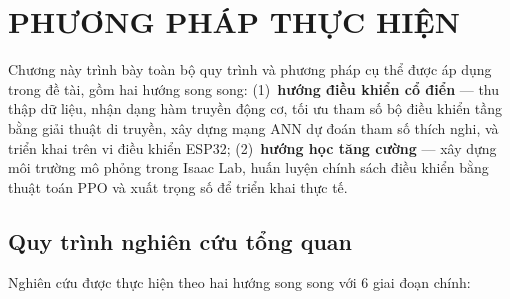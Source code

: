 
\chapter{PHƯƠNG PHÁP THỰC HIỆN}
\label{chap:phuongphap}

Chương này trình bày toàn bộ quy trình và phương pháp cụ thể được áp dụng
trong đề tài, gồm hai hướng song song: (1)~\textbf{hướng điều khiển cổ điển}
— thu thập dữ liệu, nhận dạng hàm truyền động cơ, tối ưu tham số bộ điều
khiển tầng bằng giải thuật di truyền, xây dựng mạng ANN dự đoán tham số
thích nghi, và triển khai trên vi điều khiển ESP32; (2)~\textbf{hướng học
tăng cường} — xây dựng môi trường mô phỏng trong Isaac Lab, huấn luyện
chính sách điều khiển bằng thuật toán PPO và xuất trọng số để triển khai
thực tế.


\section{Quy trình nghiên cứu tổng quan}

Nghiên cứu được thực hiện theo hai hướng song song với 6 giai đoạn chính:

